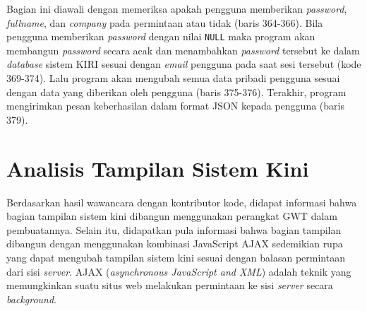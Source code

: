 Bagian ini diawali dengan memeriksa apakah pengguna memberikan \textit{password}, \textit{fullname}, dan \textit{company} pada permintaan atau tidak (baris 364-366). Bila pengguna memberikan \textit{password} dengan nilai \texttt{NULL} maka program akan membangun \textit{password} secara acak dan menambahkan \textit{password} tersebut ke dalam \textit{database} sistem KIRI sesuai dengan \textit{email} pengguna pada saat sesi tersebut (kode 369-374). Lalu program akan mengubah semua data pribadi pengguna sesuai dengan data yang diberikan oleh pengguna (baris 375-376). Terakhir, program mengirimkan pesan keberhasilan dalam format JSON kepada pengguna (baris 379).

\section{Analisis Tampilan Sistem Kini}
\label{sec:analisistampilansistemkini}
Berdasarkan hasil wawancara dengan kontributor kode, didapat informasi bahwa bagian tampilan sistem kini dibangun menggunakan perangkat GWT dalam pembuatannya. Selain itu, didapatkan pula informasi bahwa bagian tampilan dibangun dengan menggunakan kombinasi JavaScript AJAX sedemikian rupa yang dapat mengubah tampilan sistem kini sesuai dengan balasan permintaan dari sisi \textit{server}. AJAX (\textit{asynchronous JavaScript and XML}) adalah teknik yang memungkinkan suatu situs web melakukan permintaan ke sisi \textit{server} secara \textit{background}\cite{w3schools}.

